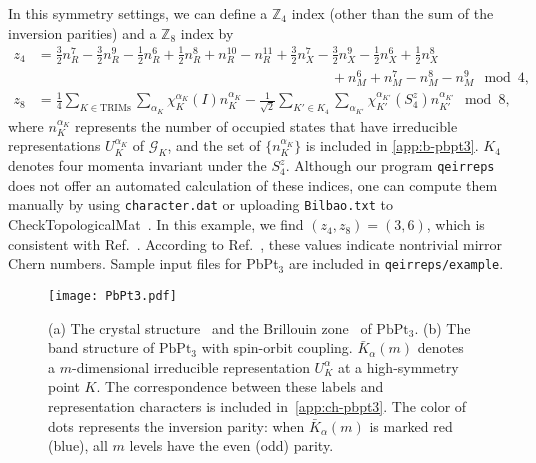 \documentclass[3p,preprint]{elsarticle}
\newcommand{\mZ}{\mathbb{Z}}
\newcommand{\calG}{\mathcal{G}}
\begin{document}
In this symmetry settings, we can define a $\mZ_4$ index (other than the sum of the inversion parities) and a $\mZ_8$ index by~\cite{PhysRevB.86.115112, PhysRevX.8.031070,QuantitativeMappings}
\begin{align}
z_4 &=\frac{3}{2}n_{R}^{7}-\frac{3}{2}n_{R}^{9}-\frac{1}{2}n_{R}^{6}+\frac{1}{2}n_{R}^{8}+n_{R}^{10}-n_{R}^{11} + \frac{3}{2}n_{X}^{7}-\frac{3}{2}n_{X}^{9}-\frac{1}{2}n_{X}^{6}+\frac{1}{2}n_{X}^{8} \nonumber\\
&\quad \quad \quad\quad \quad \quad\quad \quad \quad\quad \quad \quad\quad \quad \quad\quad \quad \quad\quad \quad \quad+n_{M}^{6}+n_{M}^{7}-n_{M}^{8}-n_{M}^{9}\mod 4,\\
z_8&=\frac{1}{4}\sum_{K\in \text{TRIMs}}\sum_{\alpha_{K}}\chi_{K}^{\alpha_K}(I) n_{K}^{\alpha_K} - \frac{1}{\sqrt{2}}\sum_{K'\in K_4}\sum_{\alpha_{K'}}\chi_{K'}^{\alpha_{K'}}(S_{4}^z) n_{K'}^{\alpha_{K'}} \mod 8,
\end{align}
where $n_{K}^{\alpha_K}$ represents the number of occupied states that have irreducible representations $U_{K}^{\alpha_K}$ of $\calG_K$, and the set of $\{n_{K}^{\alpha_K}\}$ is included in \ref{app:b-pbpt3}. $K_4$ denotes four momenta invariant under the $S_{4}^z$.
Although our program \texttt{qeirreps}  does not offer an automated calculation of these indices, one can compute them manually by using \texttt{character.dat} or uploading \texttt{Bilbao.txt} to CheckTopologicalMat~\cite{Vergniory2019}. In this example, we find $(z_4, z_8) = (3,6)$, which is consistent with Ref.~\cite{Vergniory2019}. According to Ref.~\cite{PhysRevX.8.031070,QuantitativeMappings}, these values indicate nontrivial mirror Chern numbers. Sample input files for PbPt$_3$ are included in \texttt{qeirreps/example}.



\begin{figure}[H]
	\begin{center}
		\texttt{[image: PbPt3.pdf]}
		\caption{\label{fig:PbPt3}
(a) The crystal structure~\cite{mp} and the Brillouin zone~\cite{seekpath1,seekpath2} of $\mathrm{PbPt_3}$. (b) The band structure of $\mathrm{PbPt_3}$ with spin-orbit coupling. $\bar{K}_{\alpha}(m)$ denotes a $m$-dimensional irreducible representation $U_{K}^{\alpha}$ at a high-symmetry point $K$. The correspondence between these labels and representation characters is included in~\ref{app:ch-pbpt3}. The color of dots represents the inversion parity: when $\bar{K}_{\alpha}(m)$ is marked red (blue), all $m$ levels have the even (odd) parity.}
	\end{center}
\end{figure}
\end{document}
